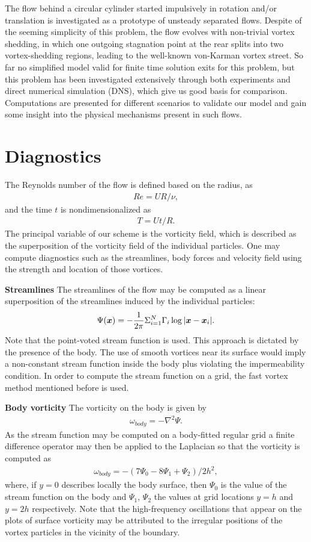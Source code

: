 
The flow behind a circular cylinder started impulsively in rotation and/or translation is investigated as a prototype of unsteady separated flows.
Despite of the seeming simplicity of this problem, the flow evolves with non-trivial vortex shedding, in which one outgoing stagnation point at the rear splits into two vortex-shedding regions, leading to the well-known von-Karman vortex street.
So far no simplified model valid for finite time solution exits for this problem, but this problem has been investigated extensively through both experiments and direct numerical simulation (DNS), which give us good basis for comparison.
Computations are presented for different scenarios to validate our model and gain some insight into the physical mechanisms present in such flows.

\section{Diagnostics}

The Reynolds number of the flow is defined based on the radius, as
\begin{align}
Re = UR/\nu,
\end{align}
and the time $t$ is nondimensionalized as
\begin{align}
T = Ut/R.
\end{align}
The principal variable of our scheme is the vorticity field, which is described as the superposition of the vorticity field of the individual particles.
One may compute diagnostics such as the streamlines, body forces and velocity field using the strength and location of those vortices.

{\bf Streamlines}
The streamlines of the flow may be computed as a linear superposition of the streamlines induced by the individual particles:
\begin{align}
\Psi (\boldsymbol{x}) = -\frac{1}{2\pi} \Sigma^{N}_{i=1} \Gamma_i \log |\boldsymbol{x} - \boldsymbol{x}_i|.
\end{align}
Note that the point-voted stream function is used. This approach is dictated by the presence of the body.
The use of smooth vortices near its surface would imply a non-constant stream function inside the body plus violating the impermeability condition.
In order to compute the stream function on a grid, the fast vortex method mentioned before is used.

{\bf Body vorticity}
The vorticity on the body is given by
\begin{align}
\omega_{body} = -\nabla^2 \Psi.
\end{align}
As the stream function may be computed on a body-fitted regular grid a finite difference operator may then be applied to the Laplacian so that the vorticity is computed as
\begin{align}
\omega_{body} = - (7\Psi_0 - 8\Psi_1 + \Psi_2) / 2h^2,
\end{align}
where, if $y = 0$ describes locally the body surface, then $\Psi_0$ is the value of the stream function on the body and $\Psi_1$, $\Psi_2$ the values at grid locations $y = h$ and $y = 2h$ respectively.
Note that the high-frequency oscillations that appear on the plots of surface vorticity may be attributed to the irregular positions of the vortex particles in the vicinity of the boundary.

